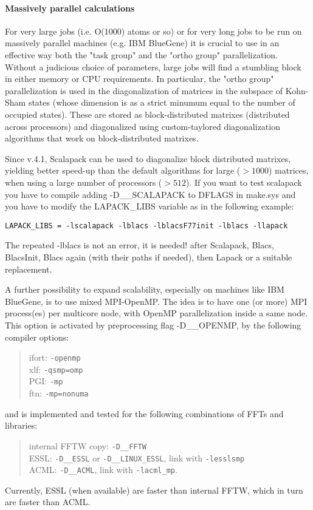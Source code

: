 \documentclass[12pt,a4paper]{article}
\begin{document}
\paragraph{Massively parallel calculations}
For very large jobs (i.e. O(1000) atoms or so) or for very long jobs
to be run on massively parallel  machines (e.g. IBM BlueGene) it is
crucial to use in an effective way both the "task group" and the
"ortho group" parallelization. Without a judicious choice of
parameters, large jobs will find a stumbling block in either memory or 
CPU requirements. In particular, the "ortho group" parallelization is
used in the diagonalization  of matrices in the subspace of Kohn-Sham
states (whose dimension is as a strict minumum equal to the number of
occupied states). These are stored as block-distributed matrixes
(distributed across processors) and diagonalized using custom-taylored
diagonalization algorithms that work on block-distributed matrixes.

Since v.4.1, Scalapack can be used to diagonalize block distributed
matrixes, yielding better speed-up than the default algorithms for
large ($ > 1000$) matrices, when using a large number of processors 
($> 512$). If you want to test scalapack  you have to compile adding
-D\_\_SCALAPACK to DFLAGS in make.sys and you have to  
modify the LAPACK\_LIBS variable as in the following example:
\begin{verbatim}
LAPACK_LIBS = -lscalapack -lblacs -lblacsF77init -lblacs -llapack
\end{verbatim}
The repeated -lblacs is not an error, it is needed! after Scalapack,
Blacs, BlacsInit, Blacs again (with their paths if needed), then
Lapack or a suitable replacement.

A further possibility to expand scalability, especially on machines
like IBM BlueGene, is to use mixed MPI-OpenMP. The idea is to have
one (or more) MPI process(es) per multicore node, with OpenMP
parallelization inside a same node. This option is activated by 
preprocessing flag -D\_\_OPENMP, by the following compiler options:
\begin{quote}
 ifort: \texttt{-openmp}\\
 xlf:   \texttt{-qsmp=omp}\\
 PGI:   \texttt{-mp}\\
 ftn:   \texttt{-mp=nonuma}
\end{quote}
and is implemented and tested for the following combinations of FFTs
and libraries:
\begin{quote}
 internal FFTW copy: \texttt{-D\_\_FFTW}\\
 ESSL: \texttt{-D\_\_ESSL} or \texttt{-D\_\_LINUX\_ESSL}, link 
 with \texttt{-lesslsmp}\\
 ACML: \texttt{-D\_\_ACML}, link with \texttt{-lacml\_mp}.
\end{quote}
Currently, ESSL (when available) are faster than internal FFTW,
which in turn are faster than ACML.
\end{document}
